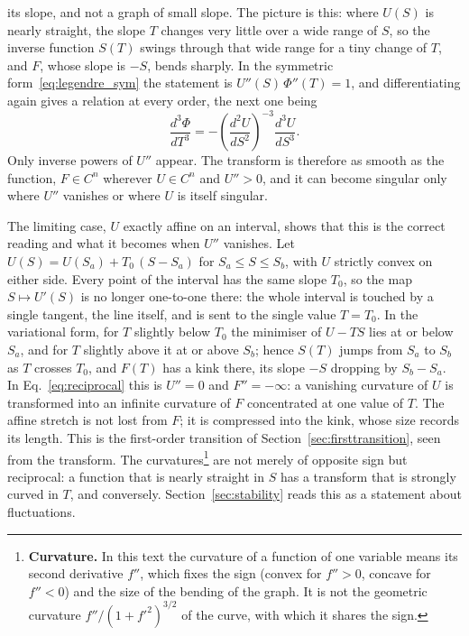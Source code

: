 \documentclass[10pt,a4paper]{article}
\theoremstyle{remark}
\begin{document}
its slope, and not a graph of small slope. The picture is this: where $U(S)$ is
nearly straight, the slope $T$ changes very little over a wide range of $S$, so
the inverse function $S(T)$ swings through that wide range for a tiny change of
$T$, and $F$, whose slope is $-S$, bends sharply.
In the symmetric form~\eqref{eq:legendre_sym} the statement is
$U''(S)\,\Phi''(T)=1$, and differentiating again gives a relation at every
order, the next one being
\[
  \frac{d^{3}\Phi}{dT^{3}}
  =-\left(\frac{d^{2}U}{dS^{2}}\right)^{-3}\frac{d^{3}U}{dS^{3}} .
\]
Only inverse powers of $U''$ appear. The transform is therefore as smooth as
the function, $F\in C^{n}$ wherever $U\in C^{n}$ and $U''>0$, and it can become
singular only where $U''$ vanishes or where $U$ is itself singular.

The limiting case, $U$ exactly affine on an interval, shows that this is the
correct reading and what it becomes when $U''$ vanishes. Let
$U(S)=U(S_a)+T_0\,(S-S_a)$ for $S_a\leq S\leq S_b$, with $U$ strictly convex
on either side. Every point of the interval has the same slope $T_0$, so the
map $S\mapsto U'(S)$ is no longer one-to-one there: the whole interval is
touched by a single tangent, the line itself, and is sent to the single value
$T=T_0$. In the variational form, for $T$ slightly below $T_0$ the minimiser
of $U-TS$ lies at or below $S_a$, and for $T$ slightly above it at or above
$S_b$; hence $S(T)$ jumps from $S_a$ to $S_b$ as $T$ crosses $T_0$, and $F(T)$
has a kink there, its slope $-S$ dropping by $S_b-S_a$. In
Eq.~\eqref{eq:reciprocal} this is $U''=0$ and $F''=-\infty$: a vanishing
curvature of $U$ is transformed into an infinite curvature of $F$ concentrated
at one value of $T$. The affine stretch is not lost from $F$; it is compressed
into the kink, whose size records its length. This is the first-order
transition of Section~\ref{sec:firsttransition}, seen from the transform.
The curvatures\footnote{\label{fn:curvature}\textbf{Curvature.} In this text
the curvature of a function of one variable means its second derivative
$f''$, which fixes the sign (convex for $f''>0$, concave for $f''<0$) and the
size of the bending of the graph. It is not the geometric curvature
$f''/(1+f'^{2})^{3/2}$ of the curve, with which it shares the sign.} are not
merely of opposite sign but reciprocal: a function that is nearly straight in $S$
has a transform that is strongly curved in $T$, and conversely.
Section~\ref{sec:stability} reads this as a statement about fluctuations.
\end{document}
